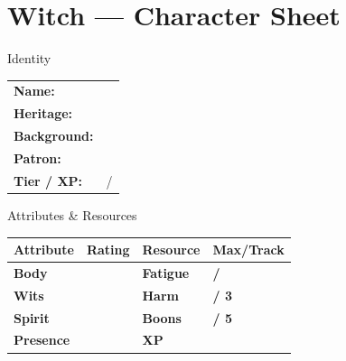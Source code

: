 \documentclass[10pt]{article}
\begin{document}
\newpage

\section*{Witch --- Character Sheet}

\begin{minipage}[t]{0.48\linewidth}
    \begin{charbox}{Identity}
        \begin{tabular}{p{2.5cm} p{5cm}}
            \textbf{Name:} & \underline{\hspace{4cm}} \\
            \textbf{Heritage:} & \underline{\hspace{4cm}} \\
            \textbf{Background:} & \underline{\hspace{4cm}} \\
            \textbf{Patron:} & \underline{\hspace{4cm}} \\
            \textbf{Tier / XP:} & \underline{\hspace{2cm}} / \underline{\hspace{2cm}} \\
        \end{tabular}
    \end{charbox}
    
    \vspace{0.5em}
    
    \begin{charbox}{Attributes \& Resources}
        \begin{tabular}{>{\bfseries}p{2.5cm} >{\bfseries}p{1.5cm} >{\bfseries}p{2.5cm} >{\bfseries}p{1.5cm}}
            \toprule
            \textbf{Attribute} & \textbf{Rating} & \textbf{Resource} & \textbf{Max/Track} \\
            \midrule
            Body & \underline{\hspace{1.5cm}} & Fatigue & \underline{\hspace{1.5cm}} / \underline{\hspace{1.5cm}} \\
            Wits & \underline{\hspace{1.5cm}} & Harm & \underline{\hspace{1.5cm}} / 3 \\
            Spirit & \underline{\hspace{1.5cm}} & Boons & \underline{\hspace{1.5cm}} / 5 \\
            Presence & \underline{\hspace{1.5cm}} & XP & \underline{\hspace{1.5cm}} \\
            \bottomrule
        \end{tabular}
    \end{charbox}
    

\end{minipage}
\end{document}
